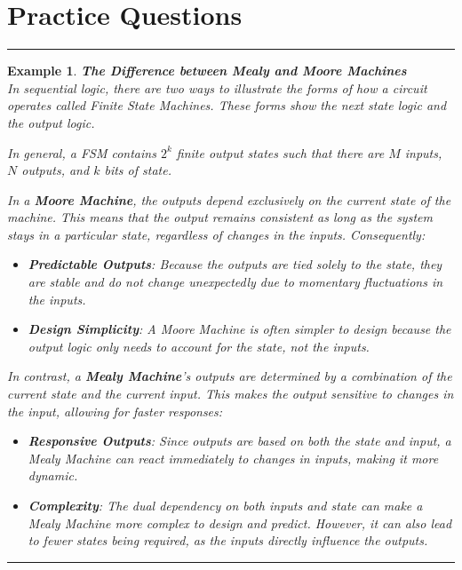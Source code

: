 \documentclass[12pt]{article}
\newtheorem{example}{Example}
\newenvironment{examp}
{
	\vspace{.5cm}
	\hrule
\begin{example}\upshape}
	{\hrule
		\vspace{0.5cm}
\end{example}}
\begin{document}
\section*{Practice Questions}
\begin{examp}
	\vspace{.5cm}
	\textbf{The Difference between Mealy and Moore Machines}\\
	In sequential logic, there are two ways to illustrate the forms of how a circuit
	operates called \textit{Finite State Machines}. These forms show the
	\textit{next state logic} and the \textit{output logic}.

	In general, a FSM contains \(2^k\) \textit{finite} output states such that
	there are \(M\) inputs, \(N\) outputs, and \(k\) bits of state.

	In a \textbf{Moore Machine}, the outputs depend exclusively on the \textit{current state} of the machine. This means that the output remains consistent as long as the system stays in a particular state, regardless of changes in the inputs. Consequently:
	\begin{itemize}
		\item \textbf{Predictable Outputs}: Because the outputs are tied solely to the state, they are stable and do not change unexpectedly due to momentary fluctuations in the inputs.
		\item \textbf{Design Simplicity}: A Moore Machine is often simpler to design because the output logic only needs to account for the state, not the inputs.
	\end{itemize}
	In contrast, a \textbf{Mealy Machine}’s outputs are determined by a combination of the \textit{current state} and the \textit{current input}. This makes the output sensitive to changes in the input, allowing for faster responses:
	\begin{itemize}
		\item \textbf{Responsive Outputs}: Since outputs are based on both the state and input, a Mealy Machine can react immediately to changes in inputs, making it more dynamic.
		\item \textbf{Complexity}: The dual dependency on both inputs and state can make a Mealy Machine more complex to design and predict. However, it can also lead to fewer states being required, as the inputs directly influence the outputs.
	\end{itemize}
\end{examp}
\end{document}

